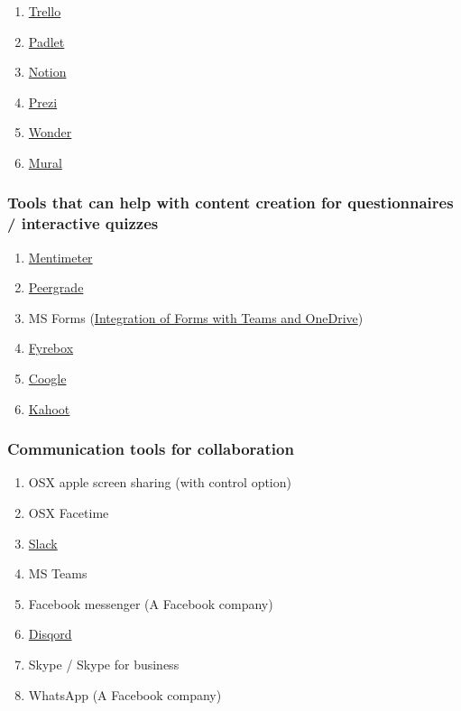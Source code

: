 \documentclass[
]{book}
\providecommand{\tightlist}{%
  \setlength{\itemsep}{0pt}\setlength{\parskip}{0pt}}
\begin{document}
\begin{enumerate}
\def\labelenumi{\arabic{enumi}.}
\tightlist
\item
  \href{https://trello.com/en}{Trello}
\item
  \href{https://padlet.com}{Padlet}
\item
  \href{https://www.notion.so}{Notion}
\item
  \href{https://prezi.com}{Prezi}
\item
  \href{https://www.wonder.me}{Wonder}
\item
  \href{https://www.mural.co}{Mural}
\end{enumerate}

\hypertarget{tools-that-can-help-with-content-creation-for-questionnaires-interactive-quizzes}{%
\subsubsection{Tools that can help with content creation for questionnaires / interactive quizzes}\label{tools-that-can-help-with-content-creation-for-questionnaires-interactive-quizzes}}

\begin{enumerate}
\def\labelenumi{\arabic{enumi}.}
\tightlist
\item
  \href{https://www.mentimeter.com}{Mentimeter}
\item
  \url{Peergrade}
\item
  MS Forms (\href{https://www.loom.com/share/ed2fd65abfd64189b2c81f8daff7ec79}{Integration of Forms with Teams and OneDrive})
\item
  \href{https://www.fyrebox.com}{Fyrebox}
\item
  \href{https://coggle.it}{Coogle}
\item
  \url{Kahoot}
\end{enumerate}

\hypertarget{communication-tools-for-collaboration}{%
\subsubsection{Communication tools for collaboration}\label{communication-tools-for-collaboration}}

\begin{enumerate}
\def\labelenumi{\arabic{enumi}.}
\tightlist
\item
  OSX apple screen sharing (with control option)
\item
  OSX Facetime
\item
  \href{https://slack.com/intl/en-dk/}{Slack}
\item
  MS Teams
\item
  Facebook messenger (A Facebook company)
\item
  \href{https://discord.com/brand-new}{Disqord}
\item
  Skype / Skype for business
\item
  WhatsApp (A Facebook company)
\end{enumerate}
\end{document}

